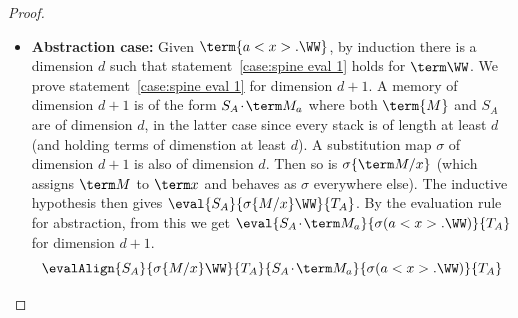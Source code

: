 \documentclass[10pt,a4paper]{amsart}
\newcommand\case[1]{\textbf{#1}}
\newcommand\msep{\kern1pt{\cdot}\kern1pt}
\begin{document}
\begin{proof}
\begin{itemize}
\item\case{Abstraction case:}
Given $\term{a<x>.\WW}$, by induction there is a dimension $d$ such that statement~\ref{case:spine eval 1} holds for $\term\WW$. We prove statement~\ref{case:spine eval 1} for dimension $d+1$. A memory of dimension $d+1$ is of the form $S_A\msep\term M_a$ where both $\term{M}$ and $S_A$ are of dimension $d$, in the latter case since every stack is of length at least $d$ (and holding terms of dimenstion at least $d$). A substitution map $\sigma$ of dimension $d+1$ is also of dimension $d$. Then so is $\sigma\{\term M/x\}$ (which assigns $\term M$ to $\term x$ and behaves as $\sigma$ everywhere else). The inductive hypothesis then gives $\eval{S_A}{\sigma\{M/x\}\WW}{T_A}$. By the evaluation rule for abstraction, from this we get $\eval{S_A\msep\term M_a}{\sigma(a<x>.\WW)}{T_A}$ for dimension $d+1$.
\[
	\evalAlign
	   {S_A}              {\sigma\{M/x\}\WW} {T_A}
	   {S_A\msep\term M_a} {\sigma(a<x>.\WW)}{T_A}
\qedhere
\]
\end{itemize}
\end{proof}

\spineTermination*
\end{document}
